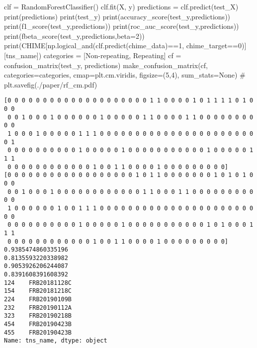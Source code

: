 \documentclass[
  letterpaper,
  DIV=11,
  numbers=noendperiod]{scrartcl}
\newenvironment{Shaded}{\begin{snugshade}}{\end{snugshade}}
\newcommand{\BuiltInTok}[1]{\textcolor[rgb]{0.00,0.23,0.31}{#1}}
\newcommand{\CommentTok}[1]{\textcolor[rgb]{0.37,0.37,0.37}{#1}}
\newcommand{\DecValTok}[1]{\textcolor[rgb]{0.68,0.00,0.00}{#1}}
\newcommand{\NormalTok}[1]{\textcolor[rgb]{0.00,0.23,0.31}{#1}}
\newcommand{\OperatorTok}[1]{\textcolor[rgb]{0.37,0.37,0.37}{#1}}
\newcommand{\StringTok}[1]{\textcolor[rgb]{0.13,0.47,0.30}{#1}}
\newcommand{\VariableTok}[1]{\textcolor[rgb]{0.07,0.07,0.07}{#1}}
\begin{document}
\begin{Shaded}
\begin{Highlighting}[]
\NormalTok{clf }\OperatorTok{=}\NormalTok{ RandomForestClassifier()}
\NormalTok{clf.fit(X, y)}
\NormalTok{predictions }\OperatorTok{=}\NormalTok{ clf.predict(test\_X)}
\BuiltInTok{print}\NormalTok{(predictions)}
\BuiltInTok{print}\NormalTok{(test\_y)}
\BuiltInTok{print}\NormalTok{(accuracy\_score(test\_y,predictions))}
\BuiltInTok{print}\NormalTok{(f1\_score(test\_y,predictions))}
\BuiltInTok{print}\NormalTok{(roc\_auc\_score(test\_y,predictions))}
\BuiltInTok{print}\NormalTok{(fbeta\_score(test\_y,predictions,beta}\OperatorTok{=}\DecValTok{2}\NormalTok{))}
\BuiltInTok{print}\NormalTok{(CHIME[np.logical\_and(clf.predict(chime\_data)}\OperatorTok{==}\DecValTok{1}\NormalTok{, chime\_target}\OperatorTok{==}\DecValTok{0}\NormalTok{)][}\StringTok{\textquotesingle{}tns\_name\textquotesingle{}}\NormalTok{])}
\NormalTok{categories }\OperatorTok{=}\NormalTok{ [}\StringTok{\textquotesingle{}Non{-}repeating\textquotesingle{}}\NormalTok{, }\StringTok{\textquotesingle{}Repeating\textquotesingle{}}\NormalTok{]}
\NormalTok{cf }\OperatorTok{=}\NormalTok{ confusion\_matrix(test\_y, predictions)}
\NormalTok{make\_confusion\_matrix(cf, }
\NormalTok{                      categories}\OperatorTok{=}\NormalTok{categories,}
\NormalTok{                      cmap}\OperatorTok{=}\NormalTok{plt.cm.viridis,}
\NormalTok{                      figsize}\OperatorTok{=}\NormalTok{(}\DecValTok{5}\NormalTok{,}\DecValTok{4}\NormalTok{),}
\NormalTok{                      sum\_stats}\OperatorTok{=}\VariableTok{None}\NormalTok{)}
\CommentTok{\# plt.savefig(\textquotesingle{}./paper/rf\_cm.pdf\textquotesingle{})}
\end{Highlighting}
\end{Shaded}

\begin{verbatim}
[0 0 0 0 0 0 0 0 0 0 0 0 0 0 0 0 0 0 0 0 1 1 0 0 0 0 1 0 1 1 1 1 0 1 0 0 0
 0 0 1 0 0 0 1 0 0 0 0 0 0 1 0 0 0 0 0 1 1 0 0 0 0 1 1 0 0 0 0 0 0 0 0 0 0
 1 0 0 0 1 0 0 0 0 0 1 1 1 0 0 0 0 0 0 0 0 0 0 0 0 0 0 0 0 0 0 0 0 0 0 0 1
 0 0 0 0 0 0 0 0 0 0 1 0 0 0 0 0 1 0 0 0 0 0 0 0 0 0 0 0 1 0 0 0 0 0 1 1 1
 0 0 0 0 0 0 0 0 0 0 0 0 1 0 0 1 1 0 0 0 0 1 0 0 0 0 0 0 0 0 0]
[0 0 0 0 0 0 0 0 0 0 0 0 0 0 0 0 0 0 1 0 1 1 0 0 0 0 0 0 0 1 0 1 0 1 0 0 0
 0 0 1 0 0 0 1 0 0 0 0 0 0 0 0 0 0 0 0 1 1 0 0 0 1 1 0 0 0 0 0 0 0 0 0 0 0
 1 0 0 0 0 0 0 1 0 0 1 1 1 0 0 0 0 0 0 0 0 0 0 0 0 0 0 0 0 0 0 0 0 0 0 0 0
 0 0 0 0 0 0 0 0 0 0 1 0 0 0 0 0 1 0 0 0 0 0 0 0 0 0 0 0 1 0 1 0 0 0 1 1 1
 0 0 0 0 0 0 0 0 0 0 0 0 1 0 0 1 1 0 0 0 0 1 0 0 0 0 0 0 0 0 0]
0.9385474860335196
0.8135593220338982
0.9053926206244087
0.8391608391608392
124    FRB20181128C
154    FRB20181218C
224    FRB20190109B
232    FRB20190112A
323    FRB20190218B
454    FRB20190423B
455    FRB20190423B
Name: tns_name, dtype: object
\end{verbatim}
\end{document}
